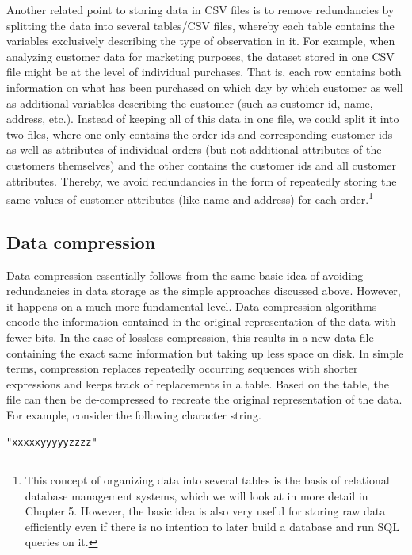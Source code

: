 \documentclass[
  12pt,
]{style/krantz}
\begin{document}
Another related point to storing data in CSV files is to remove redundancies by splitting the data into several tables/CSV files, whereby each table contains the variables exclusively describing the type of observation in it. For example, when analyzing customer data for marketing purposes, the dataset stored in one CSV file might be at the level of individual purchases. That is, each row contains both information on what has been purchased on which day by which customer as well as additional variables describing the customer (such as customer id, name, address, etc.). Instead of keeping all of this data in one file, we could split it into two files, where one only contains the order ids and corresponding customer ids as well as attributes of individual orders (but not additional attributes of the customers themselves) and the other contains the customer ids and all customer attributes. Thereby, we avoid redundancies in the form of repeatedly storing the same values of customer attributes (like name and address) for each order.\footnote{This concept of organizing data into several tables is the basis of relational database management systems, which we will look at in more detail in Chapter 5. However, the basic idea is also very useful for storing raw data efficiently even if there is no intention to later build a database and run SQL queries on it.}

\hypertarget{data-compression}{%
\subsection{Data compression}\label{data-compression}}

Data compression essentially follows from the same basic idea of avoiding redundancies in data storage as the simple approaches discussed above. However, it happens on a much more fundamental level. Data compression algorithms encode the information contained in the original representation of the data with fewer bits. In the case of lossless compression, this results in a new data file containing the exact same information but taking up less space on disk. In simple terms, compression replaces repeatedly occurring sequences with shorter expressions and keeps track of replacements in a table. Based on the table, the file can then be de-compressed to recreate the original representation of the data. For example, consider the following character string.

\begin{verbatim}
"xxxxxyyyyyzzzz"
\end{verbatim}
\end{document}
